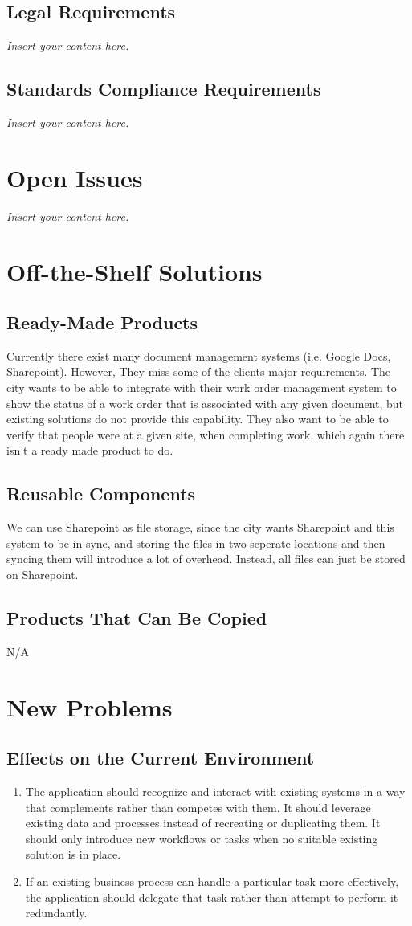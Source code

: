 \documentclass[12pt]{article}
\newcommand{\lips}{\textit{Insert your content here.}}
\begin{document}
\subsection{Legal Requirements}
\lips
\subsection{Standards Compliance Requirements}
\lips

\section{Open Issues}
\lips

\section{Off-the-Shelf Solutions}
\subsection{Ready-Made Products}
Currently there exist many document management systems (i.e. Google Docs,
Sharepoint). However, They miss some of the clients major requirements. The
city wants to be able to integrate with their work order management system to
show the status of a work order that is associated with any given document,
but existing solutions do not provide this capability. They also want to be
able to verify that people were at a given site, when completing work, which
again there isn't a ready made product to do.
\subsection{Reusable Components}
We can use Sharepoint as file storage, since the city wants Sharepoint and this
system to be in sync, and storing the files in two seperate locations and then
syncing them will introduce a lot of overhead. Instead, all files can just be
stored on Sharepoint.
\subsection{Products That Can Be Copied}
N/A

\section{New Problems}
\subsection{Effects on the Current Environment}
\begin{enumerate} 
  \item The application should recognize and interact with existing systems in a way that complements rather than competes with them. It should leverage existing data and processes instead of recreating or duplicating them.
  It should only introduce new workflows or tasks when no suitable existing solution is in place.
  \item If an existing business process can handle a particular task more effectively, the application should delegate that task rather than attempt to perform it redundantly.
\end{enumerate}
\end{document}
